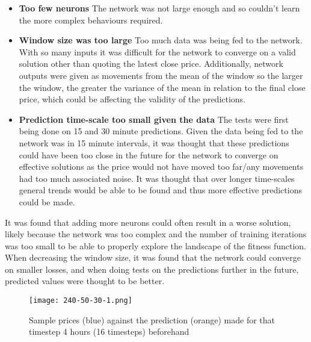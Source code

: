             \begin{itemize}
                \item \textbf{Too few neurons} The network was not large enough and so couldn't learn the more complex behaviours required.
                
                \item \textbf{Window size was too large} Too much data was being fed to the network. With so many inputs it was difficult for the network to converge on a valid solution other than quoting the latest close price. Additionally, network outputs were given as movements from the mean of the window so the larger the window, the greater the variance of the mean in relation to the final close price, which could be affecting the validity of the predictions. 
                
                \item \textbf{Prediction time-scale too small given the data} The tests were first being done on 15 and 30 minute predictions. Given the data being fed to the network was in 15 minute intervals, it was thought that these predictions could have been too close in the future for the network to converge on effective solutions as the price would not have moved too far/any movements had too much associated noise. It was thought that over longer time-scales general trends would be able to be found and thus more effective predictions could be made.
            
            \end{itemize}
            

            It was found that adding more neurons could often result in a worse solution, likely because the network was too complex and the number of training iterations was too small to be able to properly explore the landscape of the fitness function. When decreasing the window size, it was found that the network could converge on smaller losses, and when doing tests on the predictions further in the future, predicted values were thought to be better.

            \begin{figure}[htbp]
                \centering
                \texttt{[image: 240-50-30-1.png]}
                \caption{Sample prices (blue) against the prediction (orange) made for that timestep 4 hours (16 timesteps) beforehand}
                \label{fig:240_predictions}
            \end{figure}

